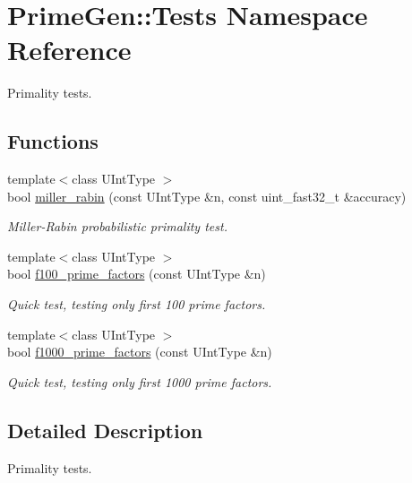 \hypertarget{namespace_prime_gen_1_1_tests}{\section{Prime\-Gen\-:\-:Tests Namespace Reference}
\label{namespace_prime_gen_1_1_tests}
}


Primality tests.  


\subsection*{Functions}
\begin{DoxyCompactItemize}
\item 
{\footnotesize template$<$class U\-Int\-Type $>$ }\\bool \hyperlink{namespace_prime_gen_1_1_tests_a4ef151cd54b58df3b5c96195497e3ac2}{miller\-\_\-rabin} (const U\-Int\-Type \&n, const uint\-\_\-fast32\-\_\-t \&accuracy)
\begin{DoxyCompactList}\small\item\em Miller-\/\-Rabin probabilistic primality test. \end{DoxyCompactList}\item 
{\footnotesize template$<$class U\-Int\-Type $>$ }\\bool \hyperlink{namespace_prime_gen_1_1_tests_ac7142f51753981c6ae4ca9c87413ab76}{f100\-\_\-prime\-\_\-factors} (const U\-Int\-Type \&n)
\begin{DoxyCompactList}\small\item\em Quick test, testing only first 100 prime factors. \end{DoxyCompactList}\item 
{\footnotesize template$<$class U\-Int\-Type $>$ }\\bool \hyperlink{namespace_prime_gen_1_1_tests_affb664bd1da7fcf28787172279145d4a}{f1000\-\_\-prime\-\_\-factors} (const U\-Int\-Type \&n)
\begin{DoxyCompactList}\small\item\em Quick test, testing only first 1000 prime factors. \end{DoxyCompactList}\end{DoxyCompactItemize}


\subsection{Detailed Description}
Primality tests. 

